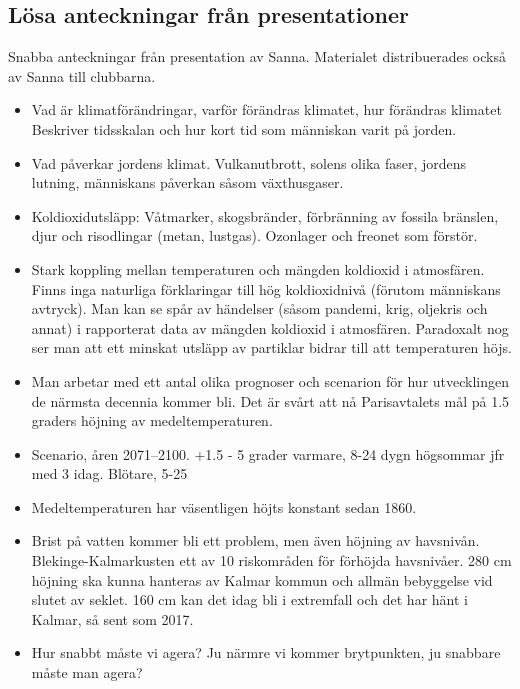 \documentclass[12pt,a4paper]{article}
\begin{document}
\subsection{Lösa anteckningar från presentationer}
Snabba anteckningar från presentation av Sanna. Materialet distribuerades också av Sanna till clubbarna.
\begin{itemize}
  \item Vad är klimatförändringar, varför förändras klimatet, hur förändras klimatet
    Beskriver tidsskalan och hur kort tid som människan varit på jorden.
  \item Vad påverkar jordens klimat. Vulkanutbrott, solens olika faser, jordens lutning, människans påverkan såsom växthusgaser.
  \item Koldioxidutsläpp:
    Våtmarker, skogsbränder, förbränning av fossila bränslen, djur och risodlingar (metan, lustgas).
    Ozonlager och freonet som förstör.
  \item Stark koppling mellan temperaturen och mängden koldioxid i atmosfären.
Finns inga naturliga förklaringar till hög koldioxidnivå (förutom människans avtryck).
Man kan se spår av händelser (såsom pandemi, krig, oljekris och annat) i rapporterat data av mängden koldioxid i atmosfären.
Paradoxalt nog ser man att ett minskat utsläpp av partiklar bidrar till att temperaturen höjs.

\item Man arbetar med ett antal olika prognoser och scenarion för hur utvecklingen de närmsta decennia kommer bli. Det är svårt att nå Parisavtalets mål på 1.5 graders höjning av medeltemperaturen.

\item Scenario, åren 2071--2100. +1.5 - 5 grader varmare, 8-24 dygn högsommar jfr med 3 idag. Blötare, 5-25%

\item Medeltemperaturen har väsentligen höjts konstant sedan 1860.

\item Brist på vatten kommer bli ett problem, men även höjning av havsnivån.
Blekinge-Kalmarkusten ett av 10 riskområden för förhöjda havsnivåer.
280 cm höjning ska kunna hanteras av Kalmar kommun och allmän bebyggelse vid slutet av seklet.
160 cm kan det idag bli i extremfall och det har hänt i Kalmar, så sent som 2017.

\item Hur snabbt måste vi agera? Ju närmre vi kommer brytpunkten, ju snabbare måste man agera?


\end{itemize}
\end{document}
